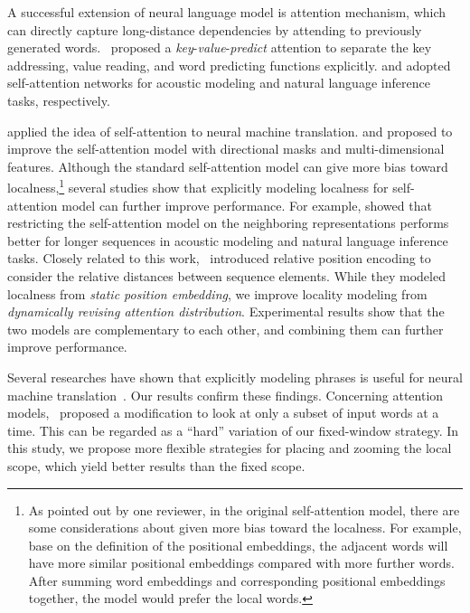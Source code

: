 \documentclass[11pt,a4paper]{article}
\begin{document}
A successful extension of neural language model is attention mechanism, which can directly capture long-distance dependencies by attending to previously generated words.~ proposed a {\em key}-{\em value}-{\em predict} attention to separate the key addressing, value reading, and word predicting functions explicitly.
 and  adopted self-attention networks for acoustic modeling and natural language inference tasks, respectively.

 applied the idea of self-attention to neural machine translation.  and  proposed to improve the self-attention model with directional masks and multi-dimensional features.
Although the standard self-attention model can give more bias toward localness,\footnote{As pointed out by one reviewer, in the original self-attention model, there are some considerations about given more bias toward the localness. For example, base on the definition of the positional embeddings, the adjacent words will have more similar positional embeddings compared with more further words. After summing word embeddings and corresponding positional embeddings together, the model would prefer the local words.}
several studies show that explicitly modeling localness for self-attention model can further improve performance.
For example,  showed that restricting the self-attention model on the neighboring representations performs better for longer sequences in acoustic modeling and natural language inference tasks.
Closely related to this work,~ introduced relative position encoding to consider the relative distances between sequence elements. While they modeled localness from {\em static position embedding}, we improve locality modeling from {\em dynamically revising attention distribution}. Experimental results show that the two models are complementary to each other, and combining them can further improve performance.

Several researches have shown that explicitly modeling phrases is useful for neural machine translation~\cite{wang2017phrases,huang2018phrasal}. Our results confirm these findings.
Concerning attention models,~ proposed a modification to look at only a subset of input words at a time. This can be regarded as a ``hard'' variation of our fixed-window strategy. In this study, we propose more flexible strategies for placing and zooming the local scope, which yield better results than the fixed scope.
\end{document}

